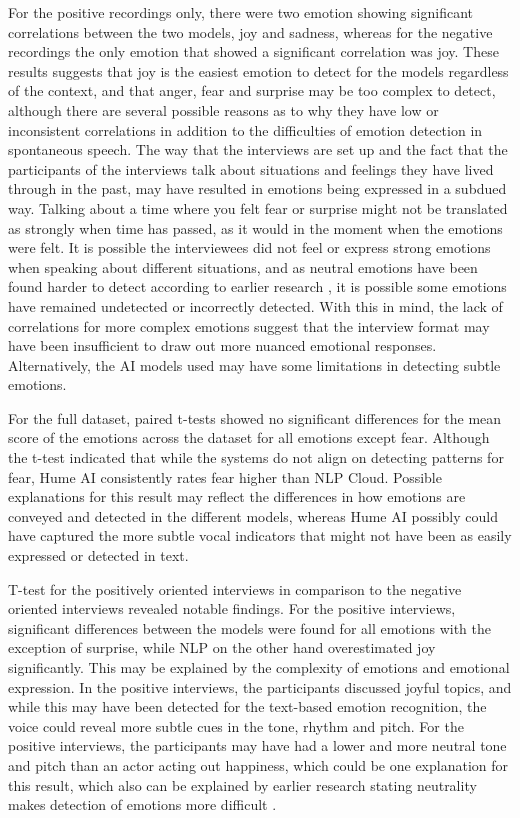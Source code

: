 For the positive recordings only, there were two emotion showing significant correlations between the two models, joy and sadness, whereas for the negative recordings the only emotion that showed a significant correlation was joy. These results suggests that joy is the easiest emotion to detect for the models regardless of the context, and that anger, fear and surprise may be too complex to detect, although there are several possible reasons as to why they have low or inconsistent correlations in addition to the difficulties of emotion detection in spontaneous speech. The way that the interviews are set up and the fact that the participants of the interviews talk about situations and feelings they have lived through in the past, may have resulted in emotions being expressed in a subdued way. Talking about a time where you felt fear or surprise might not be translated as strongly when time has passed, as it would in the moment when the emotions were felt. It is possible the interviewees did not feel or express strong emotions when speaking about different situations, and as neutral emotions have been found harder to detect according to earlier research \autocite{Cao2015}, it is possible some emotions have remained undetected or incorrectly detected. With this in mind, the lack of correlations for more complex emotions suggest that the interview format may have been insufficient to draw out more nuanced emotional responses. Alternatively, the AI models used may have some limitations in detecting subtle emotions.

For the full dataset, paired t-tests showed no significant differences for the mean score of the emotions across the dataset for all emotions except fear. Although the t-test indicated that while the systems do not align on detecting patterns for fear, Hume AI consistently rates fear higher than NLP Cloud. Possible explanations for this result may reflect the differences in how emotions are conveyed and detected in the different models, whereas Hume AI possibly could have captured the more subtle vocal indicators that might not have been as easily expressed or detected in text.

T-test for the positively oriented interviews in comparison to the negative oriented interviews revealed notable findings. For the positive interviews, significant differences between the models were found for all emotions with the exception of surprise, while NLP on the other hand overestimated joy significantly. This may be explained by the complexity of emotions and emotional expression. In the positive interviews, the participants discussed joyful topics, and while this may have been detected for the text-based emotion recognition, the voice could reveal more subtle cues in the tone, rhythm and pitch. For the positive interviews, the participants may have had a lower and more neutral tone and pitch than an actor acting out happiness, which could be one explanation for this result, which also can be explained by earlier research stating neutrality makes detection of emotions more difficult \autocite{Cao2015}.

